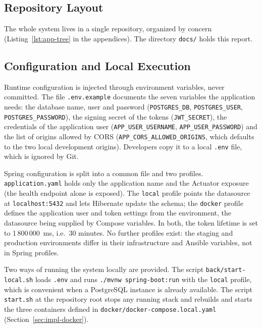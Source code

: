 \subsection{Repository Layout}

The whole system lives in a single repository, organized by concern (Listing~\ref{lst:app-tree} in the appendices). The directory \texttt{docs/} holds this report.


\subsection{Configuration and Local Execution}

Runtime configuration is injected through environment variables, never committed. The file \texttt{.env.example} documents the seven variables the application needs: the database name, user and password (\texttt{POSTGRES\_DB}, \texttt{POSTGRES\_USER}, \texttt{POSTGRES\_PASSWORD}), the signing secret of the tokens (\texttt{JWT\_SECRET}), the credentials of the application user (\texttt{APP\_USER\_USERNAME}, \texttt{APP\_USER\_PASSWORD}) and the list of origins allowed by CORS (\texttt{APP\_CORS\_ALLOWED\_ORIGINS}, which defaults to the two local development origins). Developers copy it to a local \texttt{.env} file, which is ignored by Git.

Spring configuration is split into a common file and two profiles. \texttt{application.yaml} holds only the application name and the Actuator exposure (the health endpoint alone is exposed). The \texttt{local} profile points the datasource at \texttt{localhost:5432} and lets Hibernate update the schema; the \texttt{docker} profile defines the application user and token settings from the environment, the datasource being supplied by Compose variables. In both, the token lifetime is set to 1\,800\,000~ms, i.e.\ 30 minutes. No further profiles exist: the staging and production environments differ in their infrastructure and Ansible variables, not in Spring profiles.

Two ways of running the system locally are provided. The script \texttt{back/start-local.sh} loads \texttt{.env} and runs \texttt{./mvnw spring-boot:run} with the \texttt{local} profile, which is convenient when a PostgreSQL instance is already available. The script \texttt{start.sh} at the repository root stops any running stack and rebuilds and starts the three containers defined in \texttt{docker/docker-compose.local.yaml} (Section~\ref{sec:impl-docker}).

